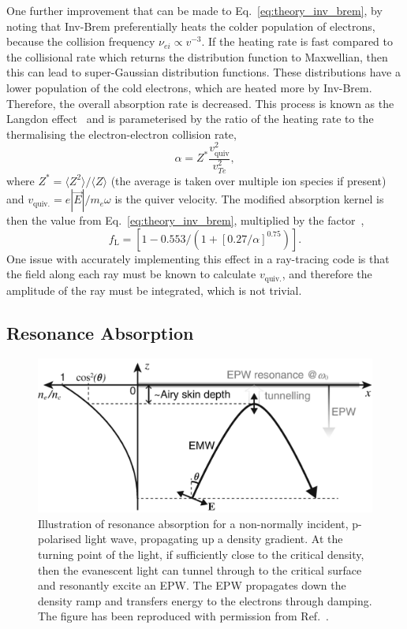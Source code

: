 One further improvement that can be made to Eq.~\ref{eq:theory_inv_brem}, by noting that \ac{Inv-Brem} preferentially heats the colder population of electrons, because the collision frequency $\nu_{ei}\propto v^{-3}$.
If the heating rate is fast compared to the collisional rate which returns the distribution function to Maxwellian, then this can lead to super-Gaussian distribution functions.
These distributions have a lower population of the cold electrons, which are heated more by \ac{Inv-Brem}.
Therefore, the overall absorption rate is decreased.
This process is known as the Langdon effect~\cite{langdon_nonlinear_1980} and is parameterised by the ratio of the heating rate to the thermalising the electron-electron collision rate,
\begin{equation}
    \label{eq:theory_alpha_langdon}
    \alpha = Z^* \frac{v_{\text{quiv}}^2}{v_{Te}^2},
\end{equation}
where $Z^* = \langle Z^2 \rangle / \langle Z \rangle $ (the average is taken over multiple ion species if present) and $v_{\text{quiv.}} = e|\vec{E}|/m_e \omega$ is the quiver velocity.
The modified absorption kernel is then the value from Eq.~\ref{eq:theory_inv_brem}, multiplied by the factor~\cite{colaitis_inverse_2021},
\begin{equation}
    f_{\text{L}} = \left[ 1 - 0.553/\left( 1 + {[0.27/\alpha]}^{0.75} \right) \right].
\end{equation}
One issue with accurately implementing this effect in a ray-tracing code is that the field along each ray must be known to calculate $v_{\text{quiv.}}$, and therefore the amplitude of the ray must be integrated, which is not trivial.

\subsection{Resonance Absorption}%
\label{sec:theory_res_abs}

\begin{figure}[t!]
    \includegraphics[width=0.65\linewidth]{Theory/Images/Res_Abs.png}
    \centering
    \caption{Illustration of resonance absorption for a non-normally incident, p-polarised light wave, propagating up a density gradient.
    At the turning point of the light, if sufficiently close to the critical density, then the evanescent light can tunnel through to the critical surface and resonantly excite an \ac{EPW}.
    The \ac{EPW} propagates down the density ramp and transfers energy to the electrons through damping.
    The figure has been reproduced with permission from Ref.~\cite{michel_introduction_2023}.}%
    \label{fig:theory_res_abs}
\end{figure}

